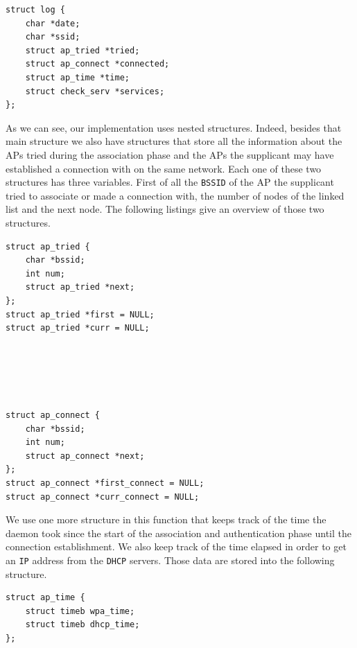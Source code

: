 \begin{lstlisting}[frame=single,breaklines=true,caption={Log structure}]
struct log {
	char *date;
	char *ssid;
	struct ap_tried *tried;
	struct ap_connect *connected;
	struct ap_time *time;
	struct check_serv *services;
};
\end{lstlisting}

As we can see, our implementation uses nested structures. Indeed, besides that main structure we also have structures that store all the information about the APs tried during the association phase and the APs the supplicant may have established a connection with on the same network. Each one of these two structures has three variables. First of all the \texttt{BSSID} of the AP the supplicant tried to associate or made a connection with, the number of nodes of the linked list and the next node. The following listings give an overview of those two structures.\\

\begin{lstlisting}[frame=single,breaklines=true,caption={Tried APs structure}]
struct ap_tried {
	char *bssid;
	int num;
	struct ap_tried *next;
};
struct ap_tried *first = NULL;
struct ap_tried *curr = NULL;
\end{lstlisting}\hfill\\\\\\\\

\begin{lstlisting}[frame=single,breaklines=true,caption={Connected APs structure}]
struct ap_connect {
	char *bssid;
	int num;
	struct ap_connect *next;
};
struct ap_connect *first_connect = NULL;
struct ap_connect *curr_connect = NULL;
\end{lstlisting}

We use one more structure in this function that keeps track of the time the daemon took since the start of the association and authentication phase until the connection establishment. We also keep track of the time elapsed in order to get an \texttt{IP} address from the \texttt{DHCP} servers. Those data are stored into the following structure.\\

\begin{lstlisting}[frame=single,breaklines=true,caption={Elapsed time structure}]
struct ap_time {
	struct timeb wpa_time;
	struct timeb dhcp_time;
};
\end{lstlisting}

